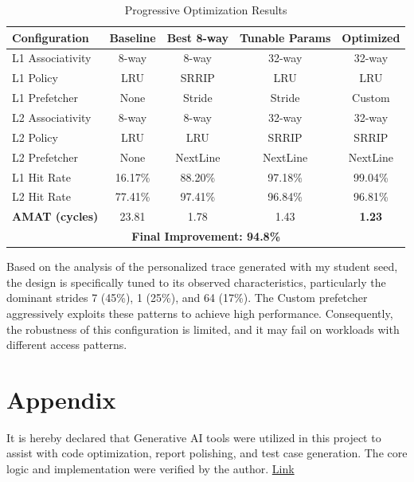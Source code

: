 \documentclass[11pt]{article}
\begin{document}
\begin{table}[H]
\scriptsize
\centering
\caption{Progressive Optimization Results}
\label{tab:progressive_opt}
\begin{tabular}{|l|c|c|c|c|}
\hline
\textbf{Configuration} & \textbf{Baseline} & \textbf{Best 8-way} & \textbf{Tunable Params} & \textbf{Optimized} \\
\hline
L1 Associativity & 8-way & 8-way & 32-way & 32-way \\
L1 Policy & LRU & SRRIP & LRU & LRU \\
L1 Prefetcher & None & Stride & Stride & Custom \\
\hline
L2 Associativity & 8-way & 8-way & 32-way & 32-way \\
L2 Policy & LRU & LRU & SRRIP & SRRIP \\
L2 Prefetcher & None & NextLine & NextLine & NextLine \\
\hline
L1 Hit Rate & 16.17\% & 88.20\% & 97.18\% & 99.04\% \\
L2 Hit Rate & 77.41\% & 97.41\% & 96.84\% & 96.81\% \\
\hline
\textbf{AMAT (cycles)} & 23.81 & 1.78 & 1.43 & \textbf{1.23} \\
\hline
\multicolumn{5}{|c|}{\textbf{Final Improvement: 94.8\%}} \\
\hline
\end{tabular}
\end{table}
Based on the analysis of the personalized trace generated with my student seed, the design is specifically tuned to its observed characteristics, particularly the dominant strides 7 (45\%), 1 (25\%), and 64 (17\%). The Custom prefetcher aggressively exploits these patterns to achieve high performance. Consequently, the robustness of this configuration is limited, and it may fail on workloads with different access patterns.

\section{Appendix}
It is hereby declared that Generative AI tools were utilized in this project to assist with code optimization, report polishing, and test case generation. The core logic and implementation were verified by the author.
\newline
\href{https://chat.deepseek.com/share/65ka837bos1nfuwja1}{Link}
\end{document}
